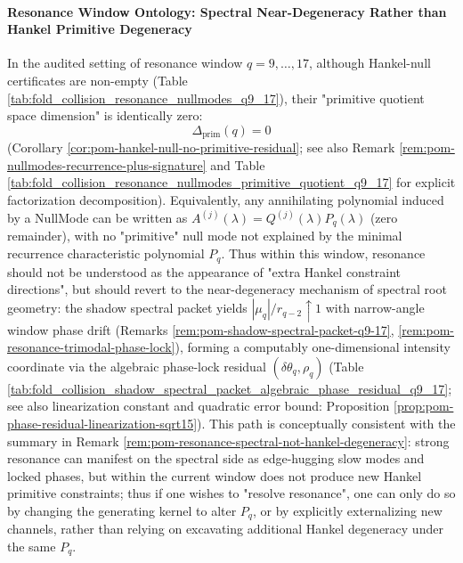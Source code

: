 \paragraph{Resonance Window Ontology: Spectral Near-Degeneracy Rather than Hankel Primitive Degeneracy}
In the audited setting of resonance window \(q=9,\dots,17\), although Hankel-null certificates are non-empty (Table \ref{tab:fold_collision_resonance_nullmodes_q9_17}),
their "primitive quotient space dimension" is identically zero:
\[
\Delta_{\mathrm{prim}}(q)=0
\]
(Corollary \ref{cor:pom-hankel-null-no-primitive-residual}; see also Remark \ref{rem:pom-nullmodes-recurrence-plus-signature} and Table \ref{tab:fold_collision_resonance_nullmodes_primitive_quotient_q9_17} for explicit factorization decomposition).
Equivalently, any annihilating polynomial induced by a NullMode can be written as \(A^{(j)}(\lambda)=Q^{(j)}(\lambda)P_q(\lambda)\) (zero remainder), with no "primitive" null mode not explained by the minimal recurrence characteristic polynomial \(P_q\).
Thus within this window, resonance should not be understood as the appearance of "extra Hankel constraint directions", but should revert to the near-degeneracy mechanism of spectral root geometry:
the shadow spectral packet yields \(|\mu_q|/r_{q-2}\uparrow 1\) with narrow-angle window phase drift (Remarks \ref{rem:pom-shadow-spectral-packet-q9-17}, \ref{rem:pom-resonance-trimodal-phase-lock}), forming a computably one-dimensional intensity coordinate via the algebraic phase-lock residual \((\delta\theta_q,\rho_q)\) (Table \ref{tab:fold_collision_shadow_spectral_packet_algebraic_phase_residual_q9_17}; see also linearization constant and quadratic error bound: Proposition \ref{prop:pom-phase-residual-linearization-sqrt15}).
This path is conceptually consistent with the summary in Remark \ref{rem:pom-resonance-spectral-not-hankel-degeneracy}: strong resonance can manifest on the spectral side as edge-hugging slow modes and locked phases, but within the current window does not produce new Hankel primitive constraints;
thus if one wishes to "resolve resonance", one can only do so by changing the generating kernel to alter \(P_q\), or by explicitly externalizing new channels, rather than relying on excavating additional Hankel degeneracy under the same \(P_q\).

